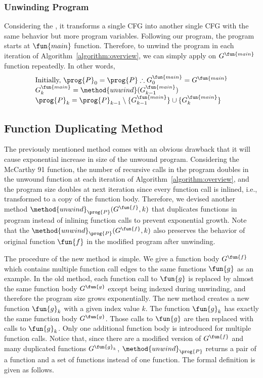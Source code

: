 \subsubsection*{Unwinding Program}
Considering the , it transforms a single CFG into another
single CFG with the same behavior but more program variables.
Following our program, the program starts at $\fun{main}$ function.
Therefore, to unwind the program in each iteration of 
Algorithm~\ref{algorithm:overview},
we can simply apply  on $G^\fun{main}$ function repeatedly.
In other words,
\[
\begin{array}{l}
\text{Initially, } \prog{P}_0 = \prog{P}
    \therefore G^\fun{main}_0 = G^\fun{main} \\
G^\fun{main}_k = \method{unwind}(G^\fun{main}_{k-1}) \\
\prog{P}_k = \prog{P}_{k-1} 
             \setminus \{G^\fun{main}_{k-1}\} \cup \{G^\fun{main}_k\}
\end{array}
\]


\subsection{Function Duplicating Method}\label{subsec:duplicating}
The previously mentioned method comes with an obvious drawback that it will
cause exponential increase in size of the unwound program.
Considering the McCarthy 91 function, the number of recursive calls in the
program doubles in the unwound function at each iteration of
Algorithm~\ref{algorithm:overview},
and the program size doubles at next iteration since every function call is
inlined, i.e., transformed to a copy of the function body.
Therefore, we devised another method $\method{unwind}_\prog{P}(G^\fun{f}, k)$
that duplicates functions in program  instead of inlining function calls
to prevent exponential growth.
Note that the $\method{unwind}_\prog{P}(G^\fun{f}, k)$ also preserves the 
behavior of original function $\fun{f}$ in the modified program  after
unwinding.

The procedure of the new method is simple.
We give a function body $G^\fun{f}$ which contains multiple function call edges
to the same functions $\fun{g}$ as an example.
In the old method, each function call to $\fun{g}$ is replaced by almost the
same function body $G^\fun{g}$ except being indexed during unwinding,
and therefore the program size grows exponentially.
The new method creates a new function $\fun{g}_k$ with a given index value $k$.
The function $\fun{g}_k$ has exactly the same function body $G^\fun{g}$.
Those calls to $\fun{g}$ are then replaced with calls to $\fun{g}_k$.
Only one additional function body is introduced for multiple function
calls.
Notice that, since there are a modified version of $G^\fun{f}$ and many 
duplicated functions $G^{\fun{g}_k}$, $\method{unwind}_\prog{P}$ returns a pair 
of a function and a set of functions instead of one function.
The formal definition is given as follows.

